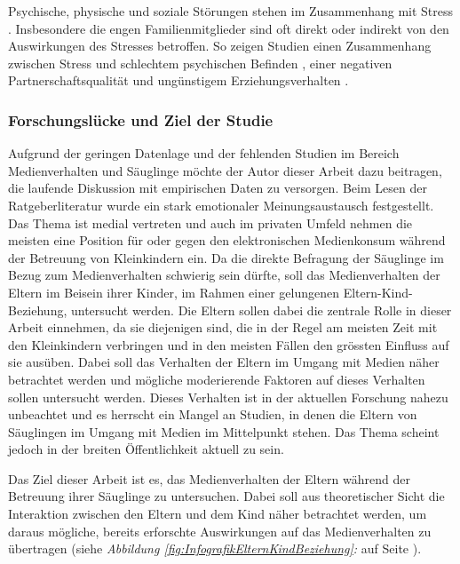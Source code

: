 Psychische, physische und soziale Störungen stehen im Zusammenhang mit Stress \cite{Elfering2002, Burisch1994}. Insbesondere die engen Familienmitglieder sind oft direkt oder indirekt von den Auswirkungen des Stresses betroffen. So zeigen Studien einen Zusammenhang zwischen Stress und schlechtem psychischen Befinden \cite{Burisch1994, Krohne1997}, einer negativen Partnerschaftsqualität \cite{Bodenmann2000, Bodenmann1999, Bodenmann2000a} und ungünstigem Erziehungsverhalten \cite{Abidin1992, Belsky1984, WebsterStratton2000}.

\subsubsection{Forschungslücke und Ziel der Studie}
Aufgrund der geringen Datenlage und der fehlenden Studien im Bereich Medienverhalten und Säuglinge möchte der Autor dieser Arbeit dazu beitragen, die laufende Diskussion mit empirischen Daten zu versorgen. Beim Lesen der Ratgeberliteratur wurde ein stark emotionaler Meinungsaustausch festgestellt. Das Thema ist medial vertreten und auch im privaten Umfeld nehmen die meisten eine Position für oder gegen den elektronischen Medienkonsum während der Betreuung von Kleinkindern ein. Da die direkte Befragung der Säuglinge im Bezug zum Medienverhalten schwierig sein dürfte, soll das Medienverhalten der Eltern im Beisein ihrer Kinder, im Rahmen einer gelungenen Eltern-Kind-Beziehung, untersucht werden. Die Eltern sollen dabei die zentrale Rolle in dieser Arbeit einnehmen, da sie diejenigen sind, die in der Regel am meisten Zeit mit den Kleinkindern verbringen und in den meisten Fällen den grössten Einfluss auf sie ausüben. Dabei soll das Verhalten der Eltern im Umgang mit Medien näher betrachtet werden und mögliche moderierende Faktoren auf dieses Verhalten sollen untersucht werden. Dieses Verhalten ist in der aktuellen Forschung nahezu unbeachtet und es herrscht ein Mangel an Studien, in denen die Eltern von Säuglingen im Umgang mit Medien im Mittelpunkt stehen. Das Thema scheint jedoch in der breiten Öffentlichkeit aktuell zu sein. 

Das Ziel dieser Arbeit ist es, das Medienverhalten der Eltern während der Betreuung ihrer Säuglinge zu untersuchen. Dabei soll aus theoretischer Sicht die Interaktion  zwischen den Eltern und dem Kind näher betrachtet werden, um daraus mögliche, bereits erforschte Auswirkungen auf das Medienverhalten zu übertragen (siehe \textit{Abbildung \ref{fig:InfografikElternKindBeziehung}: } auf Seite \pageref{fig:InfografikElternKindBeziehung}). 

